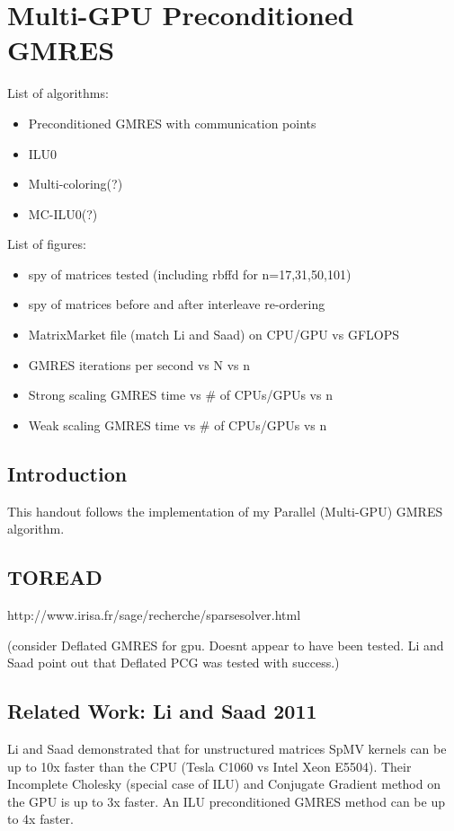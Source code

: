 \chapter{Multi-GPU Preconditioned GMRES}

List of algorithms: 
\begin{itemize} 
\item Preconditioned GMRES with communication points
\item ILU0
\item Multi-coloring(?)
\item MC-ILU0(?)
\end{itemize}
List of figures: 
\begin{itemize}
\item spy of matrices tested (including rbffd for n=17,31,50,101)
\item spy of matrices before and after interleave re-ordering
\item MatrixMarket file (match Li and Saad) on CPU/GPU vs GFLOPS
\item GMRES iterations per second vs N vs n
\item Strong scaling GMRES time vs \# of CPUs/GPUs vs n
\item Weak scaling GMRES time vs \# of CPUs/GPUs vs n
\end{itemize} 

\section{Introduction}
This handout follows the implementation of my Parallel (Multi-GPU) GMRES algorithm. 

\section{TOREAD} 

http://www.irisa.fr/sage/recherche/sparsesolver.html

(consider Deflated GMRES for gpu. Doesnt appear to have been tested. Li and Saad point out that Deflated PCG was tested with success.)

\section{Related Work: Li and Saad 2011} 

Li and Saad demonstrated that for unstructured matrices SpMV kernels can be up to 10x faster than the CPU (Tesla C1060 vs Intel Xeon E5504). 
Their Incomplete Cholesky (special case of ILU) and Conjugate Gradient method on the GPU is up to 3x faster. 
An ILU preconditioned GMRES method can be up to 4x faster. 

